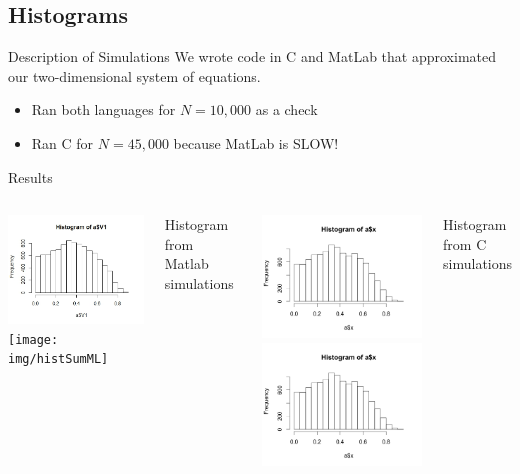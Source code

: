 
\subsection{Histograms}

\begin{frame}{Description of Simulations}
We wrote code in C and MatLab that approximated our two-dimensional system of equations. 
	\begin{itemize}
		\item Ran both languages for $N = 10,000$ as a check
		\item Ran C for $N =45,000$ because MatLab is SLOW!
	\end{itemize}
\end{frame}


\begin{frame}{Results}
 

  \begin{columns}[t]
    \includegraphics[width=6cm]{img/shrimpHistMATLAB}
		\texttt{[image: img/histSumML]}
    \begin{center} Histogram from Matlab simulations \end{center}
    \includegraphics[width=6cm]{img/Rplot}
		\includegraphics[width=6cm]{img/Rplot}
    \begin{center} Histogram from C simulations \end{center}
  \end{columns}


\end{frame}